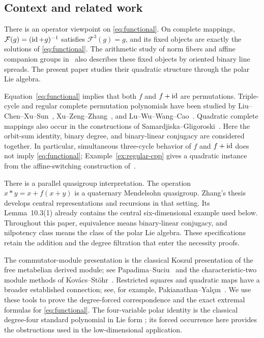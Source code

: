 \subsection{Context and related work}

There is an operator viewpoint on \eqref{eq:functional}. On complete
mappings, \(\mathcal F(g)=(\operatorname{id}+g)^{-1}\) satisfies
\(\mathcal F^3(g)=g\), and its fixed objects are exactly the solutions
of \eqref{eq:functional}. The arithmetic study of norm fibers and affine
companion groups in~\cite{Li2026} also describes these fixed objects by
oriented binary line spreads. The present paper studies their quadratic
structure through the polar Lie algebra.

Equation~\eqref{eq:functional} implies that both \(f\) and \(f+\operatorname{id}\) are
permutations. Triple-cycle and regular complete permutation polynomials
have been studied by Liu--Chen--Xu--Sun~\cite{Liu2019},
Xu--Zeng--Zhang~\cite{Xu2022}, and Lu--Wu--Wang--Cao~\cite{Lu2023}.
Quadratic complete mappings also occur in the constructions of
Samardjiska--Gligoroski~\cite{Samardjiska2017}.
Here the orbit-sum identity, binary degree, and binary-linear conjugacy
are considered together. In particular, simultaneous three-cycle behavior
of \(f\) and \(f+\operatorname{id}\) does not imply \eqref{eq:functional};
Example~\ref{ex:regular-cpp} gives a quadratic instance from the
affine-switching construction of~\cite{Xu2022}.

There is a parallel quasigroup interpretation. The operation
\(x*y=x+f(x+y)\) is a quaternary Mendelsohn quasigroup.
Zhang's thesis~\cite[Chapter~3]{Zhang1998} develops central representations
and recursions in that setting. Its Lemma~10.3(1) already contains the
central six-dimensional example used below. Throughout this paper,
equivalence means binary-linear conjugacy, and nilpotency class means
the class of the polar Lie algebra. These specifications retain the
addition and the degree filtration that enter the necessity proofs.

The commutator-module presentation is the classical Koszul presentation
of the free metabelian derived module; see
Papadima--Suciu~\cite[Theorem~6.2]{PapadimaSuciu2004} and the
characteristic-two module methods of Kov\'acs--St\"ohr~\cite{KovacsStohr2013}.
Restricted squares and quadratic maps have a broader established
connection; see, for example, Pakianathan--Yal\c{c}{\i}n~\cite{Pakianathan2007}.
We use these tools to prove the degree-forced correspondence and the exact
extremal formulas for \eqref{eq:functional}. The four-variable polar identity
is the classical degree-four standard polynomial in Lie form
\cite[Theorem~9]{Drensky2021}; its forced occurrence here provides the
obstructions used in the low-dimensional application.


